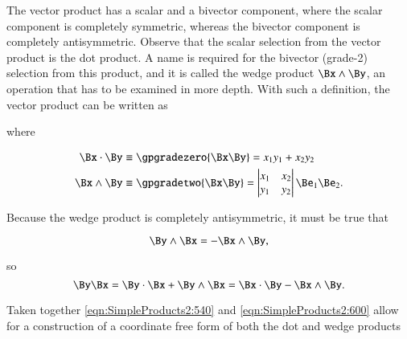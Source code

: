 The vector product has a scalar and a bivector component, where the scalar component is completely symmetric, whereas the bivector component is completely antisymmetric.
Observe that the scalar selection from the vector product is the dot product.
A name is required for the bivector (grade-2) selection from this product, and it is called the wedge product \( \Bx \wedge \By \), an operation that has to be examined in more depth.
With such a definition, the vector product can be written as


where

\begin{dmath}\label{eqn:SimpleProducts2:560}
\begin{aligned}
\Bx \cdot \By &\equiv \gpgradezero{\Bx\By} = x_1 y_1 + x_2 y_2 \\
\Bx \wedge \By &\equiv \gpgradetwo{\Bx\By} =
\begin{vmatrix}
   x_1 & x_2 \\
   y_1 & y_2
\end{vmatrix}
   \Be_1 \Be_2. \\
\end{aligned}
\end{dmath}

Because the wedge product is completely antisymmetric, it must be true that

\begin{dmath}\label{eqn:SimpleProducts2:580}
\By \wedge \Bx = -\Bx \wedge \By,
\end{dmath}

so
\begin{dmath}\label{eqn:SimpleProducts2:600}
\By \Bx
= \By \cdot \Bx + \By \wedge \Bx
= \Bx \cdot \By - \Bx \wedge \By.
\end{dmath}

Taken together \cref{eqn:SimpleProducts2:540} and \cref{eqn:SimpleProducts2:600} allow for a construction of a coordinate free form of both the dot and wedge products


